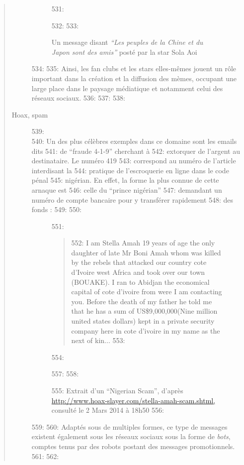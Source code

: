 \begin{quote}
\begin{description}
\begin{figure}
531:     \caption[La star du X japonaise Sola Aoi sur Sina Weibo]{Un message disant\textit{ {\textquotedblleft}Les peuples de la Chine et du Japon sont des amis{\textquotedblright} }post\'e par la star Sola Aoi}
532:     \label{fig:pornstar-weibo}
533: \end{figure}
534: 
535: Ainsi, les fan clubs et les stars elles-m\^emes jouent un r\^ole important dans la cr\'eation et la diffusion des m\`emes, occupant une large place dans le paysage m\'ediatique et notamment celui des r\'eseaux sociaux. 
536: 
537: 
538: \item[Hoax, spam]
539: \hfill \\
540: Un des plus c\'el\`ebres exemples dans ce domaine sont les emails dits
541: de {\textquotedblleft}fraude 4-1-9{\textquotedblright} cherchant \`a
542: extorquer de l{\textquoteright}argent au destinataire. Le num\'ero 419
543: correspond au num\'ero de l{\textquoteright}article interdisant la
544: pratique de l{\textquoteright}escroquerie en ligne dans le code p\'enal
545: nig\'erian. En effet, la forme la plus connue de cette arnaque est
546: celle du {\textquotedblleft}prince nig\'erian{\textquotedblright}
547: demandant un num\'ero de compte bancaire pour y transf\'erer rapidement
548: des fonds : 
549: 
550: \begin{figure}
551:     \begin{quote}
552:         I am Stella Amah 19 years of age the only daughter of late Mr Boni Amah whom was killed by the rebels that attacked our country cote d'Ivoire west Africa and took over our town (BOUAKE). I ran to Abidjan the economical capital of cote d'ivoire from were I am contacting you. Before the death of my father he told me that he has a sum of US\$9,000,000(Nine million united states dollars) kept in a private security company here in cote d'ivoire in my name as the next of kin... 
553:     \end{quote}
554:     \caption[Extrait d'un spam du type \textit{Nigerian Scam}]{
555:         Extrait d{\textquoteright}un {\textquotedblleft}Nigerian Scam{\textquotedblright}, d{\textquoteright}apr\`es \url{http://www.hoax-slayer.com/stella-amah-scam.shtml,} consult\'e le 2 Mars 2014 \`a 18h50
556:     }
557:     \label{fig:nigerian-scam}
558: \end{figure}
559: 
560: Adapt\'es sous de multiples formes, ce type de messages existent \'egalement sous les r\'eseaux sociaux sous la forme de \textit{bots}, comptes tenus par des robots postant des messages promotionnels. 
561: 
562: \end{description}

\end{quote}
